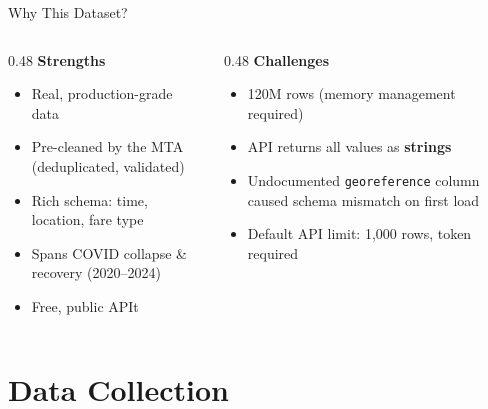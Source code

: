 \documentclass{beamer}
\begin{document}
	\begin{frame}{Why This Dataset?}
		\begin{columns}[T]
			\begin{column}{0.48\textwidth}
				\textcolor{accentBlue}{\textbf{Strengths}}
				\begin{itemize}
					\item Real, production-grade data
					\item Pre-cleaned by the MTA (deduplicated, validated)
					\item Rich schema: time, location, fare type
					\item Spans COVID collapse \& recovery (2020--2024)
					\item Free, public APIt
				\end{itemize}
			\end{column}
			\begin{column}{0.48\textwidth}
				\textcolor{mtaRed}{\textbf{Challenges}}
				\begin{itemize}
					\item 120M rows (memory management required)
					\item API returns all values as \textbf{strings}
					\item Undocumented \texttt{georeference} column caused schema mismatch on first load
					\item Default API limit: 1,000 rows, token required
				\end{itemize}
			\end{column}
		\end{columns}
	\end{frame}
	
	\section{Data Collection}
	
\end{document}
